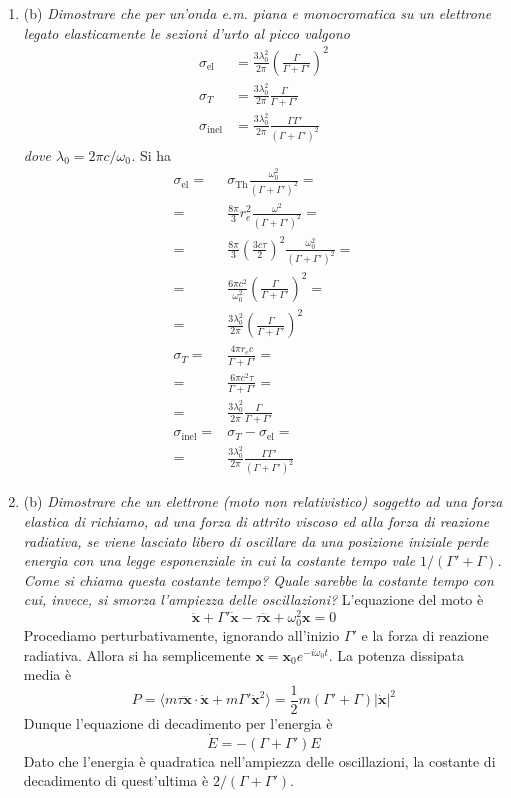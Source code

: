 \documentclass{article}
\renewcommand{\b}{(b)}
\renewcommand{\t}[1]{\textit{ #1}}
\renewcommand{\vec}[1]{\mathbf{#1}}
\begin{document}
\begin{enumerate}
\item\b\t{Dimostrare che per un’onda e.m. piana e monocromatica su un elettrone legato
	elasticamente le sezioni d’urto al picco valgono
	\begin{align*}\sigma_\mathrm{el}&= \frac{3\lambda_0^2}{2\pi}\left(\frac{\Gamma}{\Gamma+\Gamma'}\right)^2\\
	\sigma_{T}&= \frac{3\lambda_0^2}{2\pi}\frac{\Gamma}{\Gamma+\Gamma'}\\\sigma_{\mathrm{inel}} &= \frac{3\lambda_0^2}{2\pi}\frac{\Gamma\Gamma'}{(\Gamma+\Gamma')^2}\end{align*}
	dove $\lambda_0 = 2\pi c/\omega_0$.} Si ha
\begin{align*}
	\sigma_\textrm{el}=&\sigma_\textrm{Th}\frac{\omega_0^2}{(\Gamma+\Gamma')^2}=\\=&\frac{8\pi}{3}r_e^2\frac{\omega^2}{(\Gamma+\Gamma')^2}=\\=&\frac{8\pi}{3}\left(\frac{3c\tau}{2}\right)^2\frac{\omega_0^2}{(\Gamma+\Gamma')^2}=\\=&\frac{6\pi c^2}{\omega_0^2}\left(\frac{\Gamma}{\Gamma+\Gamma'}\right)^2=\\=&\frac{3\lambda_0^2}{2\pi}\left(\frac{\Gamma}{\Gamma+\Gamma'}\right)^2\\
	\sigma_T=&\frac{4\pi r_ec}{\Gamma+\Gamma'}=\\=&\frac{6\pi c^2\tau}{\Gamma+\Gamma'}=\\=&\frac{3\lambda_0^2}{2\pi}\frac{\Gamma}{\Gamma+\Gamma'}\\
	\sigma_\textrm{inel}=&\sigma_T-\sigma_\textrm{el}=\\=&\frac{3\lambda_0^2}{2\pi}\frac{\Gamma\Gamma'}{(\Gamma+\Gamma')^2}
\end{align*}
\item\b\t{Dimostrare che un elettrone (moto non relativistico) soggetto ad una forza elastica
	di richiamo, ad una forza di attrito viscoso ed alla forza di reazione radiativa, se
	viene lasciato libero di oscillare da una posizione iniziale perde energia con una
	legge esponenziale in cui la costante tempo vale $1/(\Gamma'+ \Gamma)$. Come si chiama questa
	costante tempo? Quale sarebbe la costante tempo con cui, invece, si smorza
	l'ampiezza delle oscillazioni?} L'equazione del moto è
\[\ddot{\vec{x}}+\Gamma'\dot{\vec{x}}-\tau\dddot{\vec{x}}+\omega_0^2\vec{x}=0\]
Procediamo perturbativamente, ignorando all'inizio $\Gamma'$ e la forza di reazione radiativa. Allora si ha semplicemente $\vec{x}=\vec{x}_0e^{-i\omega_0t}$. La potenza dissipata media è
\[P=\langle m\tau\dddot{\vec{x}}\cdot\dot{\vec{x}}+m\Gamma'\dot{\vec{x}}^2\rangle=\frac{1}{2}m(\Gamma'+\Gamma)|\dot{\vec{x}}|^2\]
Dunque l'equazione di decadimento per l'energia è
\[\dot{E}=-(\Gamma+\Gamma')E\]
Dato che l'energia è quadratica nell'ampiezza delle oscillazioni, la costante di decadimento di quest'ultima è $2/(\Gamma+\Gamma')$.


\end{enumerate}
\end{document}
